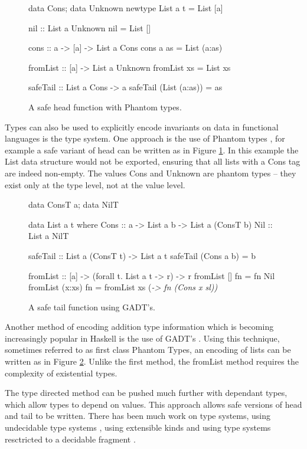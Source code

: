 \documentclass[preprint]{sigplanconf}
\newcommand{\C}[1]{\textsf{#1}}
\begin{document}
\begin{figure}
\begin{code}
data Cons; data Unknown
newtype List a t = List [a]

nil :: List a Unknown
nil = List []

cons :: a -> [a] -> List a Cons
cons a as = List (a:as)

fromList :: [a] -> List a Unknown
fromList xs = List xs

safeTail :: List a Cons -> a
safeTail (List (a:as)) = as
\end{code}
\caption{A safe \C{head} function with Phantom types.}
\label{fig:phantom}
\end{figure}

Types can also be used to explicitly encode invariants on data in functional languages is the type system. One approach is the use of Phantom types \citep{fluet:phantom}, for example a safe variant of \C{head} can be written as in Figure \ref{fig:phantom}. In this example the \C{List} data structure would not be exported, ensuring that all lists with a \C{Cons} tag are indeed non-empty. The values \C{Cons} and \C{Unknown} are phantom types -- they exist only at the type level, not at the value level.

\begin{figure}
\begin{code}
data ConsT a; data NilT

data List a t where
    Cons  :: a -> List a b -> List a (ConsT b)
    Nil   :: List a NilT

safeTail :: List a (ConsT t) -> List a t
safeTail (Cons a b) = b

fromList :: [a] -> (forall t. List a t -> r) -> r
fromList []      fn = fn Nil
fromList (x:xs)  fn = fromList xs (\sl -> fn (Cons x sl))
\end{code}
\caption{A safe \C{tail} function using GADT's.}
\label{fig:gadt}
\end{figure}

Another method of encoding addition type information which is becoming increasingly popular in Haskell is the use of GADT's \citep{gadt}. Using this technique, sometimes referred to as first class Phantom Types, an encoding of lists can be written as in Figure \ref{fig:gadt}. Unlike the first method, the \C{fromList} method requires the complexity of existential types.

The type directed method can be pushed much further with dependant types, which allow types to depend on values. This approach allows safe versions of \C{head} and \C{tail} to be written. There has been much work on type systems, using undecidable type systems \citep{cayenne, epigram}, using extensible kinds \citep{omega} and using type systems resctricted to a decidable fragment \citep{xi:dependent_practical}.
\end{document}
